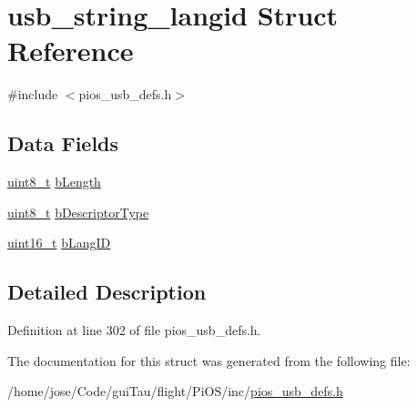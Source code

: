 \hypertarget{structusb__string__langid}{\section{usb\-\_\-string\-\_\-langid Struct Reference}
\label{structusb__string__langid}
}


{\ttfamily \#include $<$pios\-\_\-usb\-\_\-defs.\-h$>$}

\subsection*{Data Fields}
\begin{DoxyCompactItemize}
\item 
\hyperlink{stdint_8h_aba7bc1797add20fe3efdf37ced1182c5}{uint8\-\_\-t} \hyperlink{group___p_i_o_s___u_s_b___d_e_f_s_ga5d1ac83f6f30a062e5f6d89c4aa15c44}{b\-Length}
\item 
\hyperlink{stdint_8h_aba7bc1797add20fe3efdf37ced1182c5}{uint8\-\_\-t} \hyperlink{group___p_i_o_s___u_s_b___d_e_f_s_gafbb47b004fd7a76505e51c1f1530351f}{b\-Descriptor\-Type}
\item 
\hyperlink{stdint_8h_a273cf69d639a59973b6019625df33e30}{uint16\-\_\-t} \hyperlink{group___p_i_o_s___u_s_b___d_e_f_s_ga0a47e7587d6595703617971546741a5f}{b\-Lang\-I\-D}
\end{DoxyCompactItemize}


\subsection{Detailed Description}


Definition at line 302 of file pios\-\_\-usb\-\_\-defs.\-h.



The documentation for this struct was generated from the following file\-:\begin{DoxyCompactItemize}
\item 
/home/jose/\-Code/gui\-Tau/flight/\-Pi\-O\-S/inc/\hyperlink{pios__usb__defs_8h}{pios\-\_\-usb\-\_\-defs.\-h}\end{DoxyCompactItemize}
